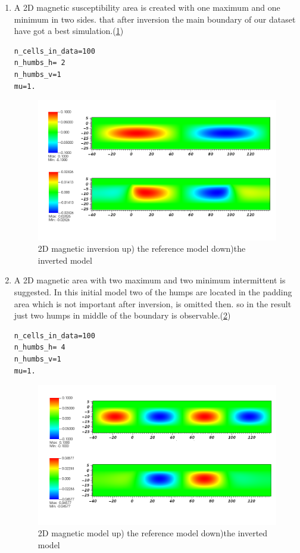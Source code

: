 \begin{enumerate}
\item A 2D magnetic susceptibility area is created with one maximum and one minimum in two sides. that after inversion the main boundary of our dataset  have got a best simulation.(\ref{fig:mag2D2}) 
\begin{verbatim}
n_cells_in_data=100
n_humbs_h= 2
n_humbs_v=1
mu=1.
\end{verbatim}

\begin{figure}
\centering
\includegraphics[width=\textwidth]{mag2D2.png}
\caption{2D magnetic inversion up) the reference model  down)the inverted model}
\label{fig:mag2D2}
\end{figure}

\item A 2D magnetic area with two maximum and two minimum intermittent is suggested. In this initial model two of the humps are located in the padding area which is not important after inversion, is omitted then. so in the result just two humps in middle of the boundary is observable.(\ref{fig:mag2D4})

\begin{verbatim}
n_cells_in_data=100
n_humbs_h= 4
n_humbs_v=1
mu=1.
\end{verbatim}

\begin{figure}
\centering
\includegraphics[width=\textwidth]{mag2D4.png}
\caption{2D magnetic model up) the reference model  down)the inverted model}
\label{fig:mag2D4}
\end{figure}


\end{enumerate}
